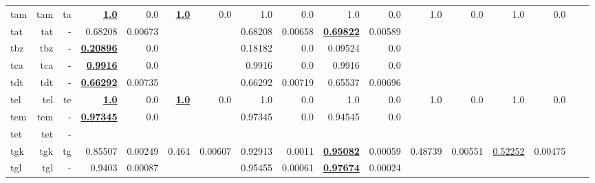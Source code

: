 \documentclass[11pt]{article}
\begin{document}
\begin{table*}[h]
{\begin{tabular}{lrrrrrrrrrrrrrrrr}
tam         & tam         & ta         & \textbf{\underline{1.0}}         & 0.0         & \textbf{\underline{1.0}}         & 0.0         & 1.0         & 0.0         & 1.0         & 0.0         & 1.0         & 0.0         & 1.0         & 0.0         \\
tat         & tat         & -         & 0.68208         & 0.00673         &          &          & 0.68208         & 0.00658         & \textbf{\underline{0.69822}}         & 0.00589         &          &          &          &          \\
tbz         & tbz         & -         & \textbf{\underline{0.20896}}         & 0.0         &          &          & 0.18182         & 0.0         & 0.09524         & 0.0         &          &          &          &          \\
tca         & tca         & -         & \textbf{\underline{0.9916}}         & 0.0         &          &          & 0.9916         & 0.0         & 0.9916         & 0.0         &          &          &          &          \\
tdt         & tdt         & -         & \textbf{\underline{0.66292}}         & 0.00735         &          &          & 0.66292         & 0.00719         & 0.65537         & 0.00696         &          &          &          &          \\
tel         & tel         & te         & \textbf{\underline{1.0}}         & 0.0         & \textbf{\underline{1.0}}         & 0.0         & 1.0         & 0.0         & 1.0         & 0.0         & 1.0         & 0.0         & 1.0         & 0.0         \\
tem         & tem         & -         & \textbf{\underline{0.97345}}         & 0.0         &          &          & 0.97345         & 0.0         & 0.94545         & 0.0         &          &          &          &          \\
tet         & tet         & -         &          &          &          &          &          &          &          &          &          &          &          &          \\
tgk         & tgk         & tg         & 0.85507         & 0.00249         & 0.464         & 0.00607         & 0.92913         & 0.0011         & \textbf{\underline{0.95082}}         & 0.00059         & 0.48739         & 0.00551         & \underline{0.52252}         & 0.00475         \\
tgl         & tgl         & -         & 0.9403         & 0.00087         &          &          & 0.95455         & 0.00061         & \textbf{\underline{0.97674}}         & 0.00024         &          &          &          &          \\

\end{tabular}}
\end{table*}
\end{document}
